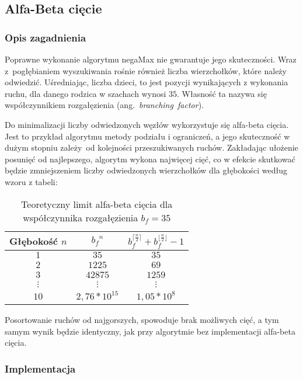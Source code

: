 \subsection{Alfa-Beta cięcie}
\label{subsec:alfa-beta-ciecie}
\subsubsection{Opis zagadnienia}
Poprawne wykonanie algorytmu negaMax nie gwarantuje jego skuteczności.
Wraz z~pogłębianiem wyszukiwania rośnie również liczba wierzchołków, które należy odwiedzić.
Uśredniając, liczba dzieci, to jest pozycji wynikających z wykonania ruchu, dla danego rodzica w szachach wynosi $35$. \cite*{branching-factor}
Własność ta nazywa się współczynnikiem rozgałęzienia (ang.~\textit{branching~factor}).

Do minimalizacji liczby odwiedzonych węzłów wykorzystuje się alfa-beta cięcia.
Jest to przykład algorytmu metody podziału i ograniczeń, a jego skuteczność w dużym stopniu zależy~od kolejności przeszukiwanych ruchów.
Zakładając ułożenie posunięć od najlepszego, algorytm wykona najwięcej cięć, co w efekcie skutkować będzie zmniejszeniem liczby odwiedzonych wierzchołków dla głębokości według wzoru z tabeli:

\begin{table}[htb] \small
\centering
\caption{Teoretyczny limit alfa-beta cięcia dla współczynnika rozgałęzienia $b_f = 35$}
\label{tab:alfa-beat-limit}
\renewcommand{\arraystretch}{1.5}
\begin{tabular}{|c|c|c|}\hline
Głębokość $n$ & ${b_{f}}^{n}$ & $b_{f}^{\lceil \frac{n}{2} \rceil} + b_{f}^{\lfloor \frac{n}{2} \rfloor} - 1$\\ \hline\hline

$1$ & $35$ & $35$\\ \hline
$2$ & $1225$ & $69$\\ \hline
$3$ & $42 875$ & $1259$\\ \hline
$\vdots$ & $\vdots$ & $\vdots$\\ \hline
$10$ & $2,76 * 10^{15}$ & $1,05 * 10^{8}$\\ \hline

\end{tabular}
\end{table}

Posortowanie ruchów od najgorszych, spowoduje brak możliwych cięć, a tym samym wynik będzie identyczny, jak przy algorytmie bez implementacji alfa-beta cięcia.


\subsubsection{Implementacja}


